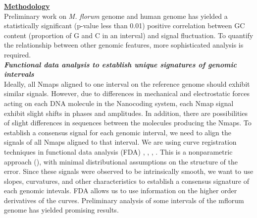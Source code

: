 \documentclass[12pt]{extarticle} %
\begin{document}
\noindent
{\underline{\bf{Methodology}}}\\
Preliminary work on {\it{M. florum}} genome and human genome has yielded a statistically significant (p-value less than 0.01) positive correlation between GC content (proportion of G and C in an interval) and signal fluctuation. To quantify the relationship between other genomic features, more sophisticated analysis is required. \\
\noindent
{\emph{\bf{Functional data analysis to establish unique signatures of genomic intervals}}}\\
Ideally, all Nmaps  aligned to one interval on the reference genome should exhibit similar signals. However, due to differences in mechanical and electrostatic forces acting on each DNA molecule in the Nanocoding system, each Nmap signal exhibit slight shifts in phases and amplitudes. In addition, there are possibilities of slight differences in sequences between the molecules producing the Nmaps. To establish a consensus signal for each genomic interval, we need to align the signals of all Nmaps aligned to that interval. We are using curve registration techniques in functional data analysis (FDA) \cite{Ramsay_Li_1998_JRSSB}, \cite{Ramsay_Silverman_2002_Applied}, \cite{Ramsay_2006_Functional}, \cite{Wang_etal_1997_AOS}. This is a nonparametric approach (\cite{Muller_1987_JASA}), with minimal distributional assumptions on the structure of the error. Since these signals were observed to be intrinsically smooth, we want to use slopes, curvatures, and other characteristics to establish a consensus signature of each genomic intevals. FDA allows us to use information on the higher order derivatives of the curves. Preliminary analysis of some intervals of the mflorum genome has yielded promising results. 
\end{document}
